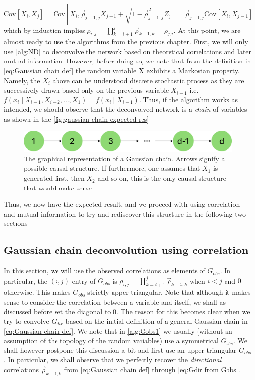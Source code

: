 \documentclass[../Thesis.tex]{subfiles}
\begin{document}
$$\text{Cov}\left[X_i, X_j\right] = \text{Cov}\left[X_i, \vec{\rho}_{j-1,j} X_{j-1} + \sqrt{1 - \vec{\rho}_{j-1,j}^2}Z_j\right] = \vec{\rho}_{j-1,j} \text{Cov}\left[X_i, X_{j-1}\right]$$
which by induction implies $\rho_{i,j} = \prod_{k=i+1}^{j} \vec{\rho}_{k-1,k} = \rho_{j,i}$. At this point, we are almost ready to use the algorithms from the previous chapter. First, we will only use \autoref{alg:ND} to deconvolve the network based on theoretical correlations and later mutual information. However, before doing so, we note that from the definition in \autoref{eq:Gaussian chain def} the random variable $\boldsymbol X$ exhibits a Markovian property. Namely, the $X_i$ above can be understood discrete stochastic process as they are successively drawn based only on the previous variable $X_{i-1}$ i.e. $f\left(x_i \mid X_{i-1}, X_{i-2} , \dots , X_{1}\right) = f\left(x_i \mid X_{i-1}\right)$. Thus, if the algorithm works as intended, we should observe that the deconvolved network is a \textit{chain} of variables as shown in the \autoref{fig:gaussian chain expected res}
\begin{figure}[ht]
    \centering
    \includegraphics[width = .7\linewidth]{figures/ND examples/Gaussian chain.png}
    \caption{The graphical representation of a Gaussian chain. Arrows signify a possible causal structure. If furthermore, one assumes that $X_1$ is generated first, then $X_2$ and so on, this is the only causal structure that would make sense.}
    \label{fig:gaussian chain expected res}
\end{figure}
Thus, we now have the expected result, and we proceed with using correlation and mutual information to try and rediscover this structure in the following two sections

\subsection{Gaussian chain deconvolution using correlation}
In this section, we will use the observed correlations as elements of $G_{obs}$. In particular, the $(i,j)$ entry of $G_{obs}$ is $\rho_{i,j} = \prod_{k=i+1}^{j} \vec{\rho}_{k-1,k}$ when $i< j$ and $0$ otherwise. This makes $G_{obs}$ strictly upper triangular. Note that although it makes sense to consider the correlation between a variable and itself, we shall as discussed before set the diagonal to $0$. The reason for this becomes clear when we try to convolve $G_{dir}$ based on the initial definition of a general Gaussian chain in \autoref{eq:Gaussian chain def}. We note that in \autoref{alg:Gobs1} we usually (without an assumption of the topology of the random variables) use a symmetrical $G_{obs}$. We shall however postpone this discussion a bit and first use an upper triangular $G_{obs}$. In particular, we shall observe that we perfectly recover the \textit{directional} correlations $\vec{\rho}_{k-1,k}$ from \autoref{eq:Gaussian chain def} through \autoref{eq:Gdir from Gobs}.
\end{document}
